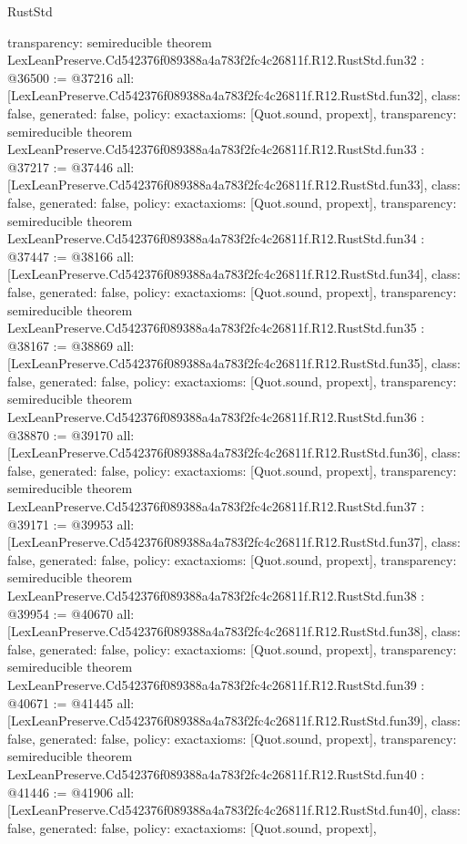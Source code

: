 \begin{lexlean}{RustStd}
\begin{coremodule}
{  transparency: semireducible
}
theorem LexLeanPreserve.Cd542376f089388a4a783f2fc4c26811f.R12.RustStd.fun32 : @36500 := @37216 {
  all: [LexLeanPreserve.Cd542376f089388a4a783f2fc4c26811f.R12.RustStd.fun32],
  class: false,
  generated: false,
  policy: exact{axioms: [Quot.sound, propext]},
  transparency: semireducible
}
theorem LexLeanPreserve.Cd542376f089388a4a783f2fc4c26811f.R12.RustStd.fun33 : @37217 := @37446 {
  all: [LexLeanPreserve.Cd542376f089388a4a783f2fc4c26811f.R12.RustStd.fun33],
  class: false,
  generated: false,
  policy: exact{axioms: [Quot.sound, propext]},
  transparency: semireducible
}
theorem LexLeanPreserve.Cd542376f089388a4a783f2fc4c26811f.R12.RustStd.fun34 : @37447 := @38166 {
  all: [LexLeanPreserve.Cd542376f089388a4a783f2fc4c26811f.R12.RustStd.fun34],
  class: false,
  generated: false,
  policy: exact{axioms: [Quot.sound, propext]},
  transparency: semireducible
}
theorem LexLeanPreserve.Cd542376f089388a4a783f2fc4c26811f.R12.RustStd.fun35 : @38167 := @38869 {
  all: [LexLeanPreserve.Cd542376f089388a4a783f2fc4c26811f.R12.RustStd.fun35],
  class: false,
  generated: false,
  policy: exact{axioms: [Quot.sound, propext]},
  transparency: semireducible
}
theorem LexLeanPreserve.Cd542376f089388a4a783f2fc4c26811f.R12.RustStd.fun36 : @38870 := @39170 {
  all: [LexLeanPreserve.Cd542376f089388a4a783f2fc4c26811f.R12.RustStd.fun36],
  class: false,
  generated: false,
  policy: exact{axioms: [Quot.sound, propext]},
  transparency: semireducible
}
theorem LexLeanPreserve.Cd542376f089388a4a783f2fc4c26811f.R12.RustStd.fun37 : @39171 := @39953 {
  all: [LexLeanPreserve.Cd542376f089388a4a783f2fc4c26811f.R12.RustStd.fun37],
  class: false,
  generated: false,
  policy: exact{axioms: [Quot.sound, propext]},
  transparency: semireducible
}
theorem LexLeanPreserve.Cd542376f089388a4a783f2fc4c26811f.R12.RustStd.fun38 : @39954 := @40670 {
  all: [LexLeanPreserve.Cd542376f089388a4a783f2fc4c26811f.R12.RustStd.fun38],
  class: false,
  generated: false,
  policy: exact{axioms: [Quot.sound, propext]},
  transparency: semireducible
}
theorem LexLeanPreserve.Cd542376f089388a4a783f2fc4c26811f.R12.RustStd.fun39 : @40671 := @41445 {
  all: [LexLeanPreserve.Cd542376f089388a4a783f2fc4c26811f.R12.RustStd.fun39],
  class: false,
  generated: false,
  policy: exact{axioms: [Quot.sound, propext]},
  transparency: semireducible
}
theorem LexLeanPreserve.Cd542376f089388a4a783f2fc4c26811f.R12.RustStd.fun40 : @41446 := @41906 {
  all: [LexLeanPreserve.Cd542376f089388a4a783f2fc4c26811f.R12.RustStd.fun40],
  class: false,
  generated: false,
  policy: exact{axioms: [Quot.sound, propext]},
}
\end{coremodule}
\end{lexlean}
